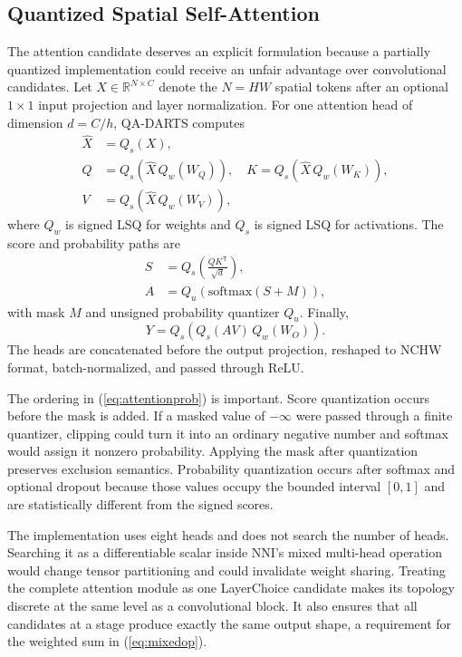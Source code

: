 \documentclass[lettersize,journal]{IEEEtran}
\begin{document}
\subsection{Quantized Spatial Self-Attention}
The attention candidate deserves an explicit formulation because a partially quantized implementation could receive an unfair advantage over convolutional candidates. Let $X\in\mathbb{R}^{N\times C}$ denote the $N=HW$ spatial tokens after an optional $1\times1$ input projection and layer normalization. For one attention head of dimension $d=C/h$, QA-DARTS computes
\begin{align}
\widehat{X} &= Q_s(X),\\
Q &= Q_s(\widehat{X}\,Q_w(W_Q)),\quad
K = Q_s(\widehat{X}\,Q_w(W_K)),\\
V &= Q_s(\widehat{X}\,Q_w(W_V)),
\label{eq:qkv}
\end{align}
where $Q_w$ is signed LSQ for weights and $Q_s$ is signed LSQ for activations. The score and probability paths are
\begin{align}
S &= Q_s\!\left(\frac{QK^{\mathsf{T}}}{\sqrt{d}}\right),\\
A &= Q_u\!\left(\mathrm{softmax}(S+M)\right),
\label{eq:attentionprob}
\end{align}
with mask $M$ and unsigned probability quantizer $Q_u$. Finally,
\begin{equation}
Y=Q_s\!\left(Q_s(AV)\,Q_w(W_O)\right).
\label{eq:attentionout}
\end{equation}
The heads are concatenated before the output projection, reshaped to NCHW format, batch-normalized, and passed through ReLU.

The ordering in (\ref{eq:attentionprob}) is important. Score quantization occurs before the mask is added. If a masked value of $-\infty$ were passed through a finite quantizer, clipping could turn it into an ordinary negative number and softmax would assign it nonzero probability. Applying the mask after quantization preserves exclusion semantics. Probability quantization occurs after softmax and optional dropout because those values occupy the bounded interval $[0,1]$ and are statistically different from the signed scores.

The implementation uses eight heads and does not search the number of heads. Searching it as a differentiable scalar inside NNI's mixed multi-head operation would change tensor partitioning and could invalidate weight sharing. Treating the complete attention module as one LayerChoice candidate makes its topology discrete at the same level as a convolutional block. It also ensures that all candidates at a stage produce exactly the same output shape, a requirement for the weighted sum in (\ref{eq:mixedop}).
\end{document}
